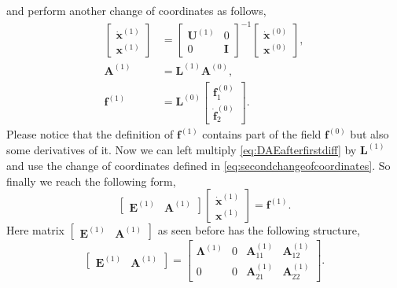 		and perform another change of coordinates as follows,
		\begin{subequations}
			\label{eq:secondchangeofcoordinates}
			\begin{align*}
				\begin{bmatrix}
					\dot{\bm{x}}^{(1)} \\
					\bm{x}^{(1)} 
				\end{bmatrix}
				&=
				\begin{bmatrix}
					\bm{U}^{(1)} & 0 \\
					0 & \bm{I} 
				\end{bmatrix}^{-1}
				\begin{bmatrix}
					\dot{\bm{x}}^{(0)} \\
					\bm{x}^{(0)}
				\end{bmatrix}, \\
				\bm{A}^{(1)} 		&= \bm{L}^{(1)}\bm{A}^{(0)}, \\
				\bm{f}^{(1)} 		&= \bm{L}^{(0)}
				\begin{bmatrix}
					\bm{f}_{1}^{(0)} \\
					\dot{\bm{f}}_{2}^{(0)}
				\end{bmatrix}.
			\end{align*}
		\end{subequations}
		Please notice that the definition of $\bm{f}^{(1)}$ contains part
		of the field $\bm{f}^{(0)}$ but also some derivatives of it.
		Now we can left multiply \cref{eq:DAEafterfirstdiff} 
		by $\bm{L}^{(1)}$ and use the change of coordinates %
		defined in \cref{eq:secondchangeofcoordinates}.
		So finally we reach the following form,
		\begin{equation}
			\begin{bmatrix}
				\bm{E}^{(1)} & \bm{A}^{(1)} 
			\end{bmatrix}
			\begin{bmatrix}
				\dot{\bm{x}}^{(1)} \\
				\bm{x}^{(1)}
			\end{bmatrix} = \bm{f}^{(1)}.
		\end{equation}
		Here matrix $\begin{bmatrix}\bm{E}^{(1)} & \bm{A}^{(1)}\end{bmatrix}$ 
		as seen before has the following structure, 
		\begin{equation}
			\begin{bmatrix}
				\bm{E}^{(1)} & \bm{A}^{(1)}
			\end{bmatrix}
			=
			\begin{bmatrix}
				\bm{\Lambda}^{(1)} 	& 0 & \bm{A}_{11}^{(1)} & \bm{A}_{12}^{(1)}  \\
				0 					& 0 & \bm{A}_{21}^{(1)} & \bm{A}_{22}^{(1)}
			\end{bmatrix}.
		\end{equation}
